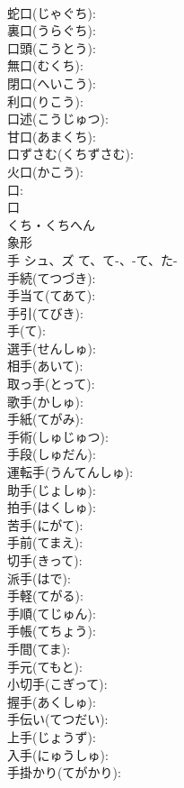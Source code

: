 \documentclass[8pt]{extreport}
\begin{document}
\begin{CJK}{UTF8}{min}
\\	蛇口(じゃぐち): 
\\	裏口(うらぐち): 
\\	口頭(こうとう): 
\\	無口(むくち): 
\\	閉口(へいこう): 
\\	利口(りこう): 
\\	口述(こうじゅつ): 
\\	甘口(あまくち): 
\\	口ずさむ(くちずさむ): 
\\	火口(かこう): 
\\	口: 
\\	口	
\\	くち・くちへん	
\\	象形 
\\	手	シュ、ズ	て、て-、-て、た-		
\\	手続(てつづき): 
\\	手当て(てあて): 
\\	手引(てびき): 
\\	手(て): 
\\	選手(せんしゅ): 
\\	相手(あいて): 
\\	取っ手(とって): 
\\	歌手(かしゅ): 
\\	手紙(てがみ): 
\\	手術(しゅじゅつ): 
\\	手段(しゅだん): 
\\	運転手(うんてんしゅ): 
\\	助手(じょしゅ): 
\\	拍手(はくしゅ): 
\\	苦手(にがて): 
\\	手前(てまえ): 
\\	切手(きって): 
\\	派手(はで): 
\\	手軽(てがる): 
\\	手順(てじゅん): 
\\	手帳(てちょう): 
\\	手間(てま): 
\\	手元(てもと): 
\\	小切手(こぎって): 
\\	握手(あくしゅ): 
\\	手伝い(てつだい): 
\\	上手(じょうず): 
\\	入手(にゅうしゅ): 
\\	手掛かり(てがかり): 

\end{CJK}
\end{document}
